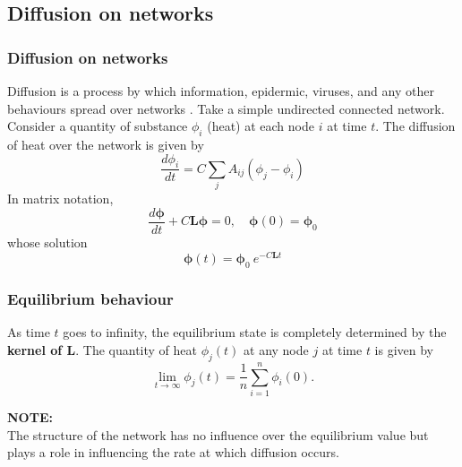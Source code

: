 \documentclass{beamer}
\begin{document}
\subsection{Diffusion on networks}
\begin{frame}
	\frametitle{Diffusion on networks}
	
		Diffusion is a process by which information, epidermic, viruses, and any other behaviours spread over networks \cite{newman2010networks}.
    	Take a simple undirected connected network. Consider a quantity of substance $\phi_i$ (heat) at each node $i$ at time $t$. The diffusion of heat over the network is given by\\
    	\begin{equation}
        \frac{d\phi_i}{dt} = C \sum_j A_{ij}(\phi_j - \phi_i)
        \end{equation} 
    	In matrix notation,
    	\begin{equation}
    	\frac{d\boldsymbol{\phi}}{dt} + C\mathbf{L}\boldsymbol{\phi} = 0, \quad \boldsymbol{\phi}(0) = \boldsymbol{\phi}_0 
    	\end{equation}
    	whose solution
    	\begin{equation}
    	  \boldsymbol{\phi}(t) = \boldsymbol{\phi}_0~e^{-C\mathbf{L}t}
    	\end{equation}  	
\end{frame}

\begin{frame}
	\frametitle{Equilibrium behaviour}
 As time $t$ goes to infinity, the equilibrium state is completely determined by the \textbf{kernel of $\mathbf{L}$}. 
 The quantity of heat $\phi_j(t)$ at any node $j$ at time $t$ is given by
 \begin{equation*}
 \lim_{t \to \infty}\phi_j(t) = \frac{1}{n} \sum_{i = 1}^n \phi_i(0). 
 \end{equation*}
 
 \vspace{1cm}
 \textbf{NOTE:} \\
 The structure of the network has no influence over the equilibrium value but plays a role in influencing the rate at which diffusion occurs.
\end{frame}
\end{document}
